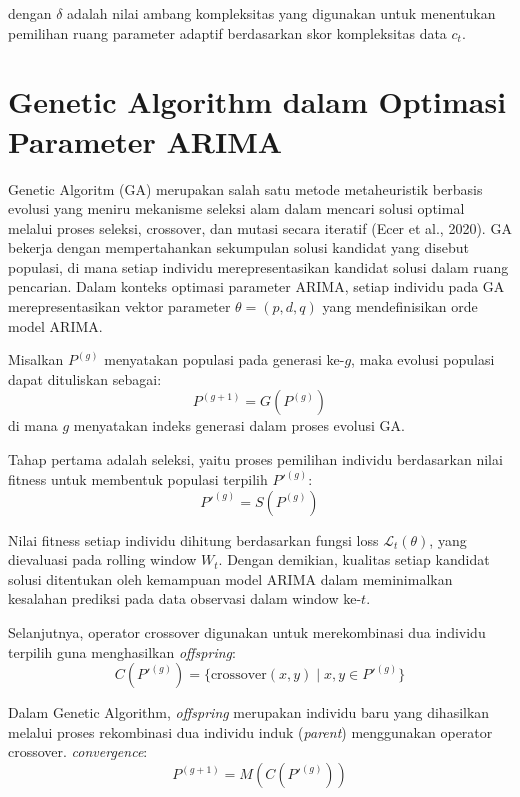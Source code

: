 dengan $\delta$ adalah nilai ambang kompleksitas yang digunakan untuk menentukan pemilihan ruang parameter adaptif berdasarkan skor kompleksitas data $c_t$.

\section{Genetic Algorithm dalam Optimasi Parameter ARIMA}

\noindent Genetic Algoritm (GA) merupakan salah satu metode metaheuristik berbasis evolusi yang meniru mekanisme seleksi alam dalam mencari solusi optimal melalui proses seleksi, crossover, dan mutasi secara iteratif (Ecer et al., 2020). GA bekerja dengan mempertahankan sekumpulan solusi kandidat yang disebut populasi, di mana setiap individu merepresentasikan kandidat solusi dalam ruang pencarian. Dalam konteks optimasi parameter ARIMA, setiap individu pada GA merepresentasikan vektor parameter $\theta = (p,d,q)$ yang mendefinisikan orde model ARIMA.


Misalkan $P^{(g)}$ menyatakan populasi pada generasi ke-$g$, maka evolusi populasi dapat dituliskan sebagai:
\begin{equation}
    P^{(g+1)} = G(P^{(g)})
\end{equation}
di mana $g$ menyatakan indeks generasi dalam proses evolusi GA.

Tahap pertama adalah seleksi, yaitu proses pemilihan individu berdasarkan nilai fitness untuk membentuk populasi terpilih $P'^{(g)}$:
\begin{equation}
    P'^{(g)} = S(P^{(g)})
\end{equation}

Nilai fitness setiap individu dihitung berdasarkan fungsi loss $\mathcal{L}_t(\theta)$, yang dievaluasi pada rolling window $W_t$. Dengan demikian, kualitas setiap kandidat solusi ditentukan oleh kemampuan model ARIMA dalam meminimalkan kesalahan prediksi pada data observasi dalam window ke-$t$.

Selanjutnya, operator crossover digunakan untuk merekombinasi dua individu terpilih guna menghasilkan \textit{offspring}:
\begin{equation}
    C(P'^{(g)}) = \{ \text{crossover}(x,y) \mid x,y \in P'^{(g)} \}
\end{equation}

\noindent Dalam Genetic Algorithm, \textit{offspring} merupakan individu baru yang dihasilkan melalui proses rekombinasi dua individu induk (\textit{parent}) menggunakan operator crossover.
\textit{convergence}:
\begin{equation}
    P^{(g+1)} = M(C(P'^{(g)}))
\end{equation}


